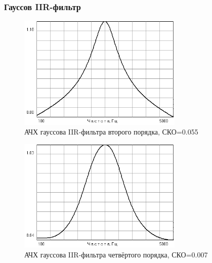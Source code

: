 \documentclass[a4paper,14pt]{extarticle}
\begin{document}
\subsubsection{Гауссов IIR-фильтр}
\begin{figure}[H]
  \centering
  \includegraphics[width=0.7\textwidth]{Z1_GAUSS/gauss_IIR_2p.png}
  \caption{АЧХ гауссова IIR-фильтра второго порядка, СКО=0.055}
  \label{fig:}
\end{figure}
\begin{figure}[H]
  \centering
  \includegraphics[width=0.7\textwidth]{Z1_GAUSS/gauss_IIR_4p.png}
  \caption{АЧХ гауссова IIR-фильтра четвёртого порядка, СКО=0.007}
  \label{fig:}
\end{figure}
\end{document}
